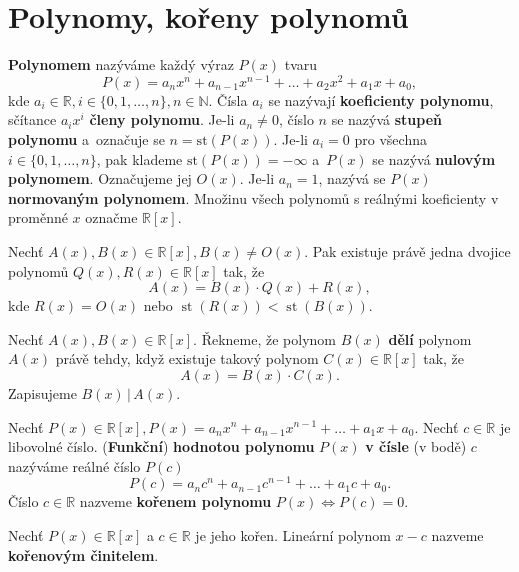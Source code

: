 \section{Polynomy, kořeny polynomů}
\begin{definition}
  \textbf{Polynomem} nazýváme každý výraz $P(x)$ tvaru
  \[
    P(x)=a_nx^n + a_{n-1}x^{n-1}+\dots + a_2x^2+a_1x+a_0,
  \]
  kde $a_i\in \mathbb R, i\in \{ 0,1,\dots , n \},n\in \mathbb N$. Čísla $a_i$ se nazývají \textbf{koeficienty polynomu}, sčítance $a_ix^i$ \textbf{členy polynomu}.
  Je-li $a_n\ne 0$, číslo $n$ se nazývá \textbf{stupeň polynomu} a~označuje se $n= \text{st}(P(x))$.
  Je-li $a_i=0$ pro všechna $i \in \{ 0,1,\dots ,n\}$, pak klademe $\text{st}(P(x))=-\infty$ a~$P(x)$ se nazývá \textbf{nulovým polynomem}.
  Označujeme jej $O(x).$ Je-li $a_n=1$, nazývá se $P(x)$ \textbf{normovaným polynomem}. Množinu všech polynomů s reálnými koeficienty v proměnné $x$ označme $\mathbb R[x]$.
\end{definition}

\begin{veta}
  Nechť $A(x), B(x) \in \mathbb R[x],B(x) \ne O(x).$ Pak existuje právě jedna dvojice polynomů $Q(x),R(x)\in \mathbb R[x]$ tak, že
  \[
    A(x)=B(x)\cdot Q(x)+R(x),
  \]
  kde $R(x)=O(x)$ nebo $\operatorname{st}(R(x))<\operatorname{st}(B(x)).$
\end{veta}

\begin{definition}
  Nechť $A(x), B(x) \in \mathbb R[x]$. Řekneme, že polynom $B(x)$ \textbf{dělí} polynom $A(x)$ právě tehdy, když existuje takový polynom $C(x) \in \mathbb R[x]$ tak, že
  \[
    A(x) = B(x)\cdot C(x).
  \]
  Zapisujeme $B(x) \, | \, A(x).$
\end{definition}

\begin{definition}
  Nechť $P(x)\in \mathbb R[x], P(x)=a_nx^n+a_{n-1}x^{n-1}+\dots +a_1x+a_0.$ Nechť $c\in \mathbb R$ je libovolné číslo. (\textbf{Funkční}) \textbf{hodnotou polynomu} $P(x)$ \textbf{v čísle} (v bodě) $c$ nazýváme reálné číslo $P(c)$
  \[
    P(c) = a_nc^n+a_{n-1}c^{n-1}+\dots+a_1c+a_0.
  \]
  Číslo $c\in \mathbb R$ nazveme \textbf{kořenem polynomu} $P(x) \iff P(c) = 0$.
\end{definition}


\begin{definition}
  Nechť $P(x) \in \mathbb R [x]$ a $c\in \mathbb R$ je jeho kořen. Lineární polynom $x-c$ nazveme \textbf{kořenovým činitelem}.
\end{definition}

